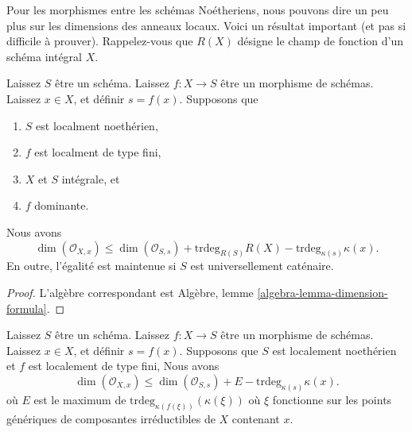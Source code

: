 \noindent
Pour les morphismes entre les schémas Noétheriens, nous pouvons dire un peu plus sur les dimensions des anneaux locaux. Voici un résultat important (et pas si difficile à prouver). Rappelez-vous que $R(X)$ désigne le champ de fonction d'un schéma intégral $X$.

\begin{lemma}

\label{lemma-dimension-formula}
Laissez $S$ être un schéma. Laissez $f : X \to S$ être un morphisme de schémas. Laissez $x \in X$, et définir $s = f(x)$. Supposons que
\begin{enumerate}
\item $S$ est localment noethérien,
\item $f$ est localment de type fini,
\item $X$ et $S$ intégrale, et
\item $f$ dominante.
\end{enumerate}
Nous avons
\begin{equation}
\label{equation-dimension-formula}
\dim(\mathcal{O}_{X, x})
\leq
\dim(\mathcal{O}_{S, s}) + \text{trdeg}_{R(S)}R(X)
- \text{trdeg}_{\kappa(s)} \kappa(x).
\end{equation}
En outre, l'égalité est maintenue si $S$ est universellement caténaire.
\end{lemma}

\begin{proof}
L'algèbre correspondant est Algèbre, lemme \ref{algebra-lemma-dimension-formula}.
\end{proof}

\begin{lemma}

\label{lemma-dimension-formula-general}
Laissez $S$ être un schéma. Laissez $f : X \to S$ être un morphisme de schémas. Laissez $x \in X$, et définir $s = f(x)$. Supposons que $S$ est localement noethérien et $f$ est localement de type fini, Nous avons
\begin{equation}
\label{equation-dimension-formula-general}
\dim(\mathcal{O}_{X, x})
\leq
\dim(\mathcal{O}_{S, s}) + E - \text{trdeg}_{\kappa(s)} \kappa(x).
\end{equation}
où $E$ est le maximum de $\text{trdeg}_{\kappa(f(\xi))}(\kappa(\xi))$ où $\xi$ fonctionne sur les points génériques de composantes irréductibles de $X$ contenant $x$.
\end{lemma}

